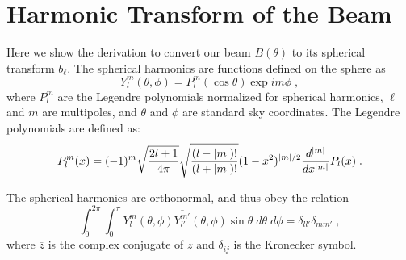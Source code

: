 \chapter{Harmonic Transform of the Beam} %
\label{app:trans} 

Here we show the derivation to convert our beam $B(\theta)$ to its spherical transform $b_\ell$. The spherical harmonics are functions defined on the sphere as
\begin{equation}
    Y_l^m(\theta,\phi) = P_l^m(\cos\theta)\exp{i m\phi} \; ,
\end{equation}
where $P_l^m$ are the Legendre polynomials normalized for spherical harmonics, $\ell$ and $m$ are multipoles, and $\theta$ and $\phi$ are standard sky coordinates. The Legendre polynomials are defined as:
\begin{equation}
    P_l^m(x) = (-1)^m\sqrt{\frac{2l+1}{4\pi}}\sqrt{\frac{(l-\abs{m})!}{(l+\abs{m})!}}(1-x^2)^{\abs{m}/2}\frac{d^{\abs{m}}}{dx^{\abs{m}}}P_l(x) \; .
\end{equation}

The spherical harmonics are orthonormal, and thus obey the relation
\begin{equation}
    \int_0^{2\pi}\int_0^{\pi} Y_l^m(\theta,\phi)\overline{Y_{l'}^{m'}}(\theta,\phi) \sin\theta \; d\theta\; d\phi = \delta_{ll'}\delta_{mm'} \; ,
\end{equation}
where $\overline{z}$ is the complex conjugate of $z$ and $\delta_{ij}$ is the Kronecker symbol.

